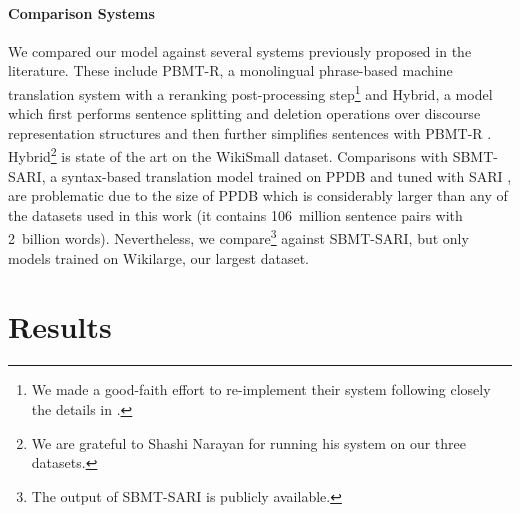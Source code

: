 \documentclass[11pt,letterpaper]{article}
\begin{document}
\paragraph{Comparison Systems}
\label{sec:model:comp}
We compared our model against several systems previously proposed in
the literature. These include PBMT-R, a monolingual phrase-based
machine translation system with a reranking post-processing
step\footnote{We made a good-faith effort to re-implement their system
  following closely the details in .}
\cite{wubben2012sentence} and Hybrid, a model which first performs
sentence splitting and deletion operations over discourse
representation structures and then further simplifies sentences with
{PBMT-R} \cite{narayan-gardent:2014}. Hybrid\footnote{We are grateful
  to Shashi Narayan for running his system on our three datasets.} is
state of the art on the WikiSmall dataset. Comparisons with
\mbox{SBMT-SARI}, a syntax-based translation model trained on PPDB
\cite{ganitkevitch2013ppdb} and tuned with SARI \cite{Xu_TACL16}, are
problematic due to the size of PPDB which is considerably larger than
any of the datasets used in this work (it contains 106~million
sentence pairs with 2~billion words). Nevertheless, we
compare\footnote{The output of SBMT-SARI is publicly available.}
against SBMT-SARI, but only models trained on Wikilarge, our largest
dataset.






\section{Results}
\label{sec:results}
\end{document}
